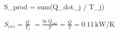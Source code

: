 S_prod = sum(Q_dot_j / T_j)

\( S_{erz} = \frac{\dot{Q}}{T_j} \)  
\( = \frac{\text{in } Q_{out}}{T} = \frac{Q}{T} = 0.11 \, \text{kW/K} \)